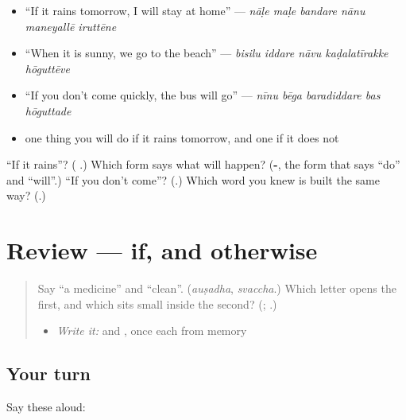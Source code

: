 \begin{itemize}
\raggedright
  \item \textquotedblleft{}If it rains tomorrow, I will stay at home\textquotedblright{} — \emph{nāḷe maḷe bandare nānu maneyallē iruttēne}
  \item \textquotedblleft{}When it is sunny, we go to the beach\textquotedblright{} — \emph{bisilu iddare nāvu kaḍalatīrakke hōguttēve}
  \item \textquotedblleft{}If you don't come quickly, the bus will go\textquotedblright{} — \emph{nīnu bēga baradiddare bas hōguttade}
  \item one thing you will do if it rains tomorrow, and one if it does not
\end{itemize}

\begin{tcolorbox}[breakable,colback=teal!4,colframe=teal!35!black,title={Before you move on}]
\textquotedblleft{}If it rains\textquotedblright{}? (\textbf{ }.) Which form says what will happen? (\textbf{-}, the form that says \textquotedblleft{}do\textquotedblright{} and \textquotedblleft{}will\textquotedblright{}.) \textquotedblleft{}If you don't come\textquotedblright{}? (\textbf{}.) Which word you knew is built the same way? (\textbf{}.)
\end{tcolorbox}
\section[(review)]{Review — if, and otherwise}

\label{lesson:KA-R317-if-and-otherwise}



\begin{quote}
Say \textquotedblleft{}a medicine\textquotedblright{} and \textquotedblleft{}clean\textquotedblright{}. (\emph{auṣadha}, \emph{svaccha}.) Which letter opens the first, and which sits small inside the second? (\textbf{}; \textbf{}.)

\begin{itemize}
\raggedright
  \item \emph{Write it:} \textbf{} and \textbf{}, once each from memory
\end{itemize}
\end{quote}

\subsection*{Your turn}
Say these aloud:

